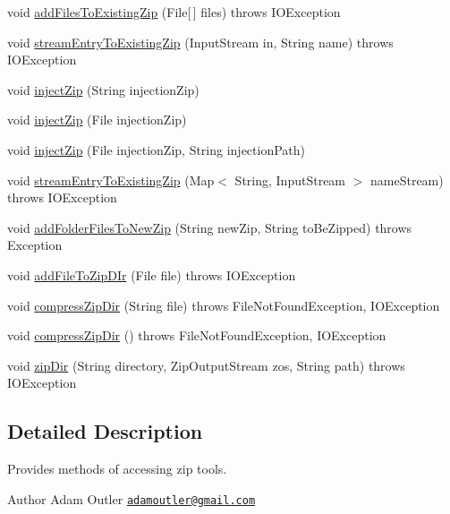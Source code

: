 \begin{DoxyCompactItemize}
\item 
void \hyperlink{class_c_a_s_u_a_l_1_1archiving_1_1_zip_afb0e0e812a4fb259b8c4af21ece047ba}{add\-Files\-To\-Existing\-Zip} (File\mbox{[}$\,$\mbox{]} files)  throws I\-O\-Exception 
\item 
void \hyperlink{class_c_a_s_u_a_l_1_1archiving_1_1_zip_a79c5b8d507f0b2207657968ce04d7662}{stream\-Entry\-To\-Existing\-Zip} (Input\-Stream in, String name)  throws I\-O\-Exception 
\item 
void \hyperlink{class_c_a_s_u_a_l_1_1archiving_1_1_zip_afba344b319d35382ac45f0019135f2bb}{inject\-Zip} (String injection\-Zip)
\item 
void \hyperlink{class_c_a_s_u_a_l_1_1archiving_1_1_zip_a793ea3d539a12d8dac7a623f98372cf7}{inject\-Zip} (File injection\-Zip)
\item 
void \hyperlink{class_c_a_s_u_a_l_1_1archiving_1_1_zip_ae822ac657cc2f6ecda6789a9fb5dd03a}{inject\-Zip} (File injection\-Zip, String injection\-Path)
\item 
void \hyperlink{class_c_a_s_u_a_l_1_1archiving_1_1_zip_ae77b937fded9d3d6d0a2cf8759ab6b93}{stream\-Entry\-To\-Existing\-Zip} (Map$<$ String, Input\-Stream $>$ name\-Stream)  throws I\-O\-Exception 
\item 
void \hyperlink{class_c_a_s_u_a_l_1_1archiving_1_1_zip_a5f5fae25d91196d11da0e6387dfbba97}{add\-Folder\-Files\-To\-New\-Zip} (String new\-Zip, String to\-Be\-Zipped)  throws Exception 
\item 
void \hyperlink{class_c_a_s_u_a_l_1_1archiving_1_1_zip_a4d9cc06f35c9d8ffcece89cec48e045b}{add\-File\-To\-Zip\-D\-Ir} (File file)  throws I\-O\-Exception 
\item 
void \hyperlink{class_c_a_s_u_a_l_1_1archiving_1_1_zip_a42720ff4df86cf4f26b465a7c078fb75}{compress\-Zip\-Dir} (String file)  throws File\-Not\-Found\-Exception, I\-O\-Exception 
\item 
void \hyperlink{class_c_a_s_u_a_l_1_1archiving_1_1_zip_a8e9092ce77563c5b450d1e9c5c56a872}{compress\-Zip\-Dir} ()  throws File\-Not\-Found\-Exception, I\-O\-Exception 
\item 
void \hyperlink{class_c_a_s_u_a_l_1_1archiving_1_1_zip_a265a180ad36454517d139b18d1e0ef45}{zip\-Dir} (String directory, Zip\-Output\-Stream zos, String path)  throws I\-O\-Exception 
\end{DoxyCompactItemize}


\subsection{Detailed Description}
Provides methods of accessing zip tools. \begin{DoxyAuthor}{Author}
Adam Outler \href{mailto:adamoutler@gmail.com}{\tt adamoutler@gmail.\-com} 
\end{DoxyAuthor}


